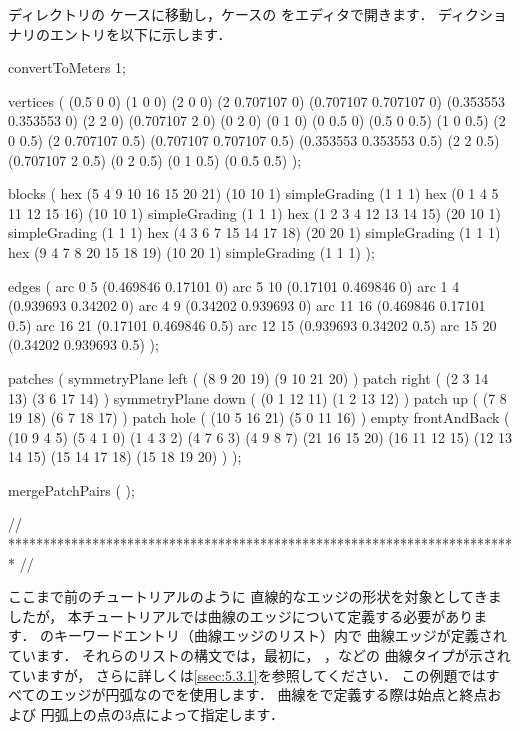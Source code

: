 ディレクトリの
ケースに移動し，ケースの
をエディタで開きます．
ディクショナリのエントリを以下に示します．
\begin{OFverbatim}[file, linenum=17]
convertToMeters 1;

vertices        
(
    (0.5 0 0)
    (1 0 0)
    (2 0 0)
    (2 0.707107 0)
    (0.707107 0.707107 0)
    (0.353553 0.353553 0)
    (2 2 0)
    (0.707107 2 0)
    (0 2 0)
    (0 1 0)
    (0 0.5 0)
    (0.5 0 0.5)
    (1 0 0.5)
    (2 0 0.5)
    (2 0.707107 0.5)
    (0.707107 0.707107 0.5)
    (0.353553 0.353553 0.5)
    (2 2 0.5)
    (0.707107 2 0.5)
    (0 2 0.5)
    (0 1 0.5)
    (0 0.5 0.5)
);

blocks          
(
    hex (5 4 9 10 16 15 20 21) (10 10 1) simpleGrading (1 1 1)
    hex (0 1 4 5 11 12 15 16) (10 10 1) simpleGrading (1 1 1)
    hex (1 2 3 4 12 13 14 15) (20 10 1) simpleGrading (1 1 1)
    hex (4 3 6 7 15 14 17 18) (20 20 1) simpleGrading (1 1 1)
    hex (9 4 7 8 20 15 18 19) (10 20 1) simpleGrading (1 1 1)
);

edges           
(
    arc 0 5 (0.469846 0.17101 0)
    arc 5 10 (0.17101 0.469846 0)
    arc 1 4 (0.939693 0.34202 0)
    arc 4 9 (0.34202 0.939693 0)
    arc 11 16 (0.469846 0.17101 0.5)
    arc 16 21 (0.17101 0.469846 0.5)
    arc 12 15 (0.939693 0.34202 0.5)
    arc 15 20 (0.34202 0.939693 0.5)
);

patches         
(
    symmetryPlane left 
    (
        (8 9 20 19)
        (9 10 21 20)
    )
    patch right 
    (
        (2 3 14 13)
        (3 6 17 14)
    )
    symmetryPlane down 
    (
        (0 1 12 11)
        (1 2 13 12)
    )
    patch up 
    (
        (7 8 19 18)
        (6 7 18 17)
    )
    patch hole 
    (
        (10 5 16 21)
        (5 0 11 16)
    )
    empty frontAndBack 
    (
        (10 9 4 5)
        (5 4 1 0)
        (1 4 3 2)
        (4 7 6 3)
        (4 9 8 7)
        (21 16 15 20)
        (16 11 12 15)
        (12 13 14 15)
        (15 14 17 18)
        (15 18 19 20)
    )
);

mergePatchPairs
(
);

// ************************************************************************* //
\end{OFverbatim}
ここまで前のチュートリアルのように
直線的なエッジの形状を対象としてきましたが，
本チュートリアルでは曲線のエッジについて定義する必要があります．
のキーワードエントリ（曲線エッジのリスト）内で
曲線エッジが定義されています．
それらのリストの構文では，最初に，
，などの
曲線タイプが示されていますが，
さらに詳しくは\autoref{ssec:5.3.1}を参照してください．
この例題ではすべてのエッジが円弧なのでを使用します．
曲線をで定義する際は始点と終点および
円弧上の点の3点によって指定します．

